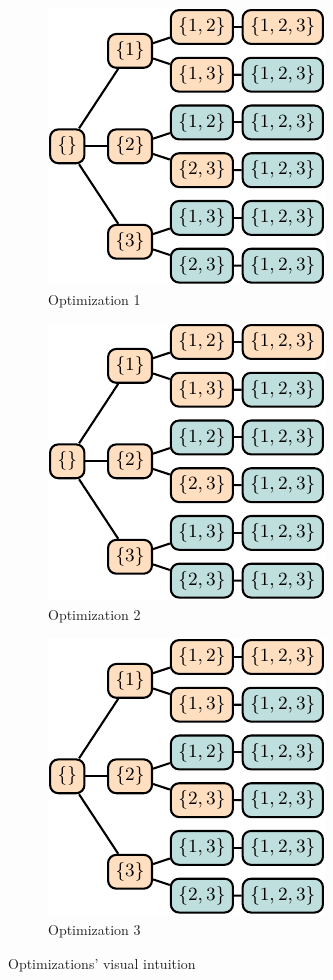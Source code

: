 \begin{figure}[!ht]
  \captionsetup[subfigure]{aboveskip=1em,belowskip=1em}  \begin{subfigure}[b]{\columnwidth}
    \includegraphics[page=8]{figures/mhs2/figures/opts/main}
    \caption{Optimization 1\label{fig:mhs2o:opt1-intuition}}
  \end{subfigure}

  \begin{subfigure}[b]{\columnwidth}
    \includegraphics[scale=1.1,page=9]{figures/mhs2/figures/opts/main}
    \caption{Optimization 2\label{fig:mhs2o:opt2-intuition}}
  \end{subfigure}

  \begin{subfigure}[b]{\columnwidth}
    \includegraphics[scale=1.1,page=10]{figures/mhs2/figures/opts/main}
    \caption{Optimization 3\label{fig:mhs2o:opt3-intuition}}
  \end{subfigure}
  \caption{Optimizations' visual intuition\label{fig:mhs2o:intuition}}
\end{figure}

